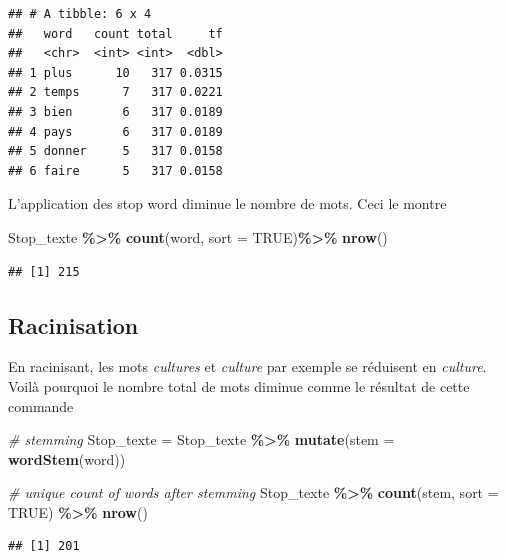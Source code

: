 \documentclass[
]{article}
\newenvironment{Shaded}{\begin{snugshade}}{\end{snugshade}}
\newcommand{\AttributeTok}[1]{\textcolor[rgb]{0.13,0.29,0.53}{#1}}
\newcommand{\CommentTok}[1]{\textcolor[rgb]{0.56,0.35,0.01}{\textit{#1}}}
\newcommand{\ConstantTok}[1]{\textcolor[rgb]{0.56,0.35,0.01}{#1}}
\newcommand{\FunctionTok}[1]{\textcolor[rgb]{0.13,0.29,0.53}{\textbf{#1}}}
\newcommand{\NormalTok}[1]{#1}
\newcommand{\OtherTok}[1]{\textcolor[rgb]{0.56,0.35,0.01}{#1}}
\newcommand{\SpecialCharTok}[1]{\textcolor[rgb]{0.81,0.36,0.00}{\textbf{#1}}}
\begin{document}
\begin{verbatim}
## # A tibble: 6 x 4
##   word   count total     tf
##   <chr>  <int> <int>  <dbl>
## 1 plus      10   317 0.0315
## 2 temps      7   317 0.0221
## 3 bien       6   317 0.0189
## 4 pays       6   317 0.0189
## 5 donner     5   317 0.0158
## 6 faire      5   317 0.0158
\end{verbatim}

L'application des stop word diminue le nombre de mots. Ceci le montre

\begin{Shaded}
\begin{Highlighting}[]
\NormalTok{Stop\_texte }\SpecialCharTok{\%\textgreater{}\%}
  \FunctionTok{count}\NormalTok{(word, }\AttributeTok{sort =} \ConstantTok{TRUE}\NormalTok{)}\SpecialCharTok{\%\textgreater{}\%}
  \FunctionTok{nrow}\NormalTok{()}
\end{Highlighting}
\end{Shaded}

\begin{verbatim}
## [1] 215
\end{verbatim}

\subsection{Racinisation}\label{racinisation}

En racinisant, les mots \emph{cultures} et \emph{culture} par exemple se
réduisent en \emph{culture}. Voilà pourquoi le nombre total de mots
diminue comme le résultat de cette commande

\begin{Shaded}
\begin{Highlighting}[]
\CommentTok{\# stemming}
\NormalTok{Stop\_texte }\OtherTok{=}\NormalTok{ Stop\_texte }\SpecialCharTok{\%\textgreater{}\%}
  \FunctionTok{mutate}\NormalTok{(}\AttributeTok{stem =} \FunctionTok{wordStem}\NormalTok{(word))}

\CommentTok{\# unique count of words after stemming}
\NormalTok{Stop\_texte }\SpecialCharTok{\%\textgreater{}\%}
  \FunctionTok{count}\NormalTok{(stem, }\AttributeTok{sort =} \ConstantTok{TRUE}\NormalTok{) }\SpecialCharTok{\%\textgreater{}\%}
  \FunctionTok{nrow}\NormalTok{()}
\end{Highlighting}
\end{Shaded}

\begin{verbatim}
## [1] 201
\end{verbatim}
\end{document}
